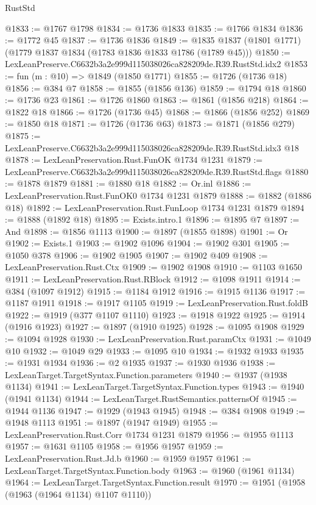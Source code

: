 \begin{lexlean}{RustStd}
\begin{coremodule}
@1833 := @1767 @1798
@1834 := @1736 @1833
@1835 := @1766 @1834
@1836 := @1772 @45
@1837 := @1736 @1836
@1849 := @1835 @1837 (@1801 @1771) (@1779 @1837 @1834 (@1783 @1836 @1833 @1786 (@1789 @45)))
@1850 := LexLeanPreserve.C6632b3a2e999d115038026ca828209de.R39.RustStd.idx2
@1853 := fun (m : @10) => @1849 (@1850 @1771)
@1855 := @1726 (@1736 @18)
@1856 := @384 @7
@1858 := @1855 (@1856 @136)
@1859 := @1794 @18
@1860 := @1736 @23
@1861 := @1726 @1860
@1863 := @1861 (@1856 @218)
@1864 := @1822 @18
@1866 := @1726 (@1736 @45)
@1868 := @1866 (@1856 @252)
@1869 := @1850 @18
@1871 := @1726 (@1736 @63)
@1873 := @1871 (@1856 @279)
@1875 := LexLeanPreserve.C6632b3a2e999d115038026ca828209de.R39.RustStd.idx3 @18
@1878 := LexLeanPreservation.Rust.FunOK @1734 @1231
@1879 := LexLeanPreserve.C6632b3a2e999d115038026ca828209de.R39.RustStd.flags
@1880 := @1878 @1879
@1881 := @1880 @18
@1882 := Or.inl
@1886 := LexLeanPreservation.Rust.FunOK0 @1734 @1231 @1879
@1888 := @1882 (@1886 @18)
@1892 := LexLeanPreservation.Rust.FunLoop @1734 @1231 @1879
@1894 := @1888 (@1892 @18)
@1895 := Exists.intro.{1}
@1896 := @1895 @7
@1897 := And
@1898 := @1856 @1113
@1900 := @1897 (@1855 @1898)
@1901 := Or
@1902 := Exists.{1}
@1903 := @1902 @1096
@1904 := @1902 @301
@1905 := @1050 @378
@1906 := @1902 @1905
@1907 := @1902 @409
@1908 := LexLeanPreservation.Rust.Ctx
@1909 := @1902 @1908
@1910 := @1103 @1650
@1911 := LexLeanPreservation.Rust.RBlock
@1912 := @1098 @1911
@1914 := @384 (@1097 @1912)
@1915 := @1184 @1912
@1916 := @1915 @1136
@1917 := @1187 @1911
@1918 := @1917 @1105
@1919 := LexLeanPreservation.Rust.foldB
@1922 := @1919 (@377 @1107 @1110)
@1923 := @1918 @1922
@1925 := @1914 (@1916 @1923)
@1927 := @1897 (@1910 @1925)
@1928 := @1095 @1908
@1929 := @1094 @1928
@1930 := LexLeanPreservation.Rust.paramCtx
@1931 := @1049 @10
@1932 := @1049 @29
@1933 := @1095 @10
@1934 := @1932 @1933
@1935 := @1931 @1934
@1936 := @2 @1935
@1937 := @1930 @1936
@1938 := LexLeanTarget.TargetSyntax.Function.parameters
@1940 := @1937 (@1938 @1134)
@1941 := LexLeanTarget.TargetSyntax.Function.types
@1943 := @1940 (@1941 @1134)
@1944 := LexLeanTarget.RustSemantics.patternsOf
@1945 := @1944 @1136
@1947 := @1929 (@1943 @1945)
@1948 := @384 @1908
@1949 := @1948 @1113
@1951 := @1897 (@1947 @1949)
@1955 := LexLeanPreservation.Rust.Corr @1734 @1231 @1879
@1956 := @1955 @1113
@1957 := @1631 @1105
@1958 := @1956 @1957
@1959 := LexLeanPreservation.Rust.Jd.b
@1960 := @1959 @1957
@1961 := LexLeanTarget.TargetSyntax.Function.body
@1963 := @1960 (@1961 @1134)
@1964 := LexLeanTarget.TargetSyntax.Function.result
@1970 := @1951 (@1958 (@1963 (@1964 @1134) @1107 @1110))

\end{coremodule}
\end{lexlean}
